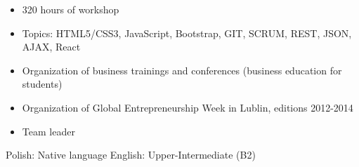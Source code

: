\documentclass{my_cv}
\begin{document}
\begin{adjustwidth}{2em}{0em}

\begin{itemize}
    \item 320 hours of workshop
    \item Topics: HTML5/CSS3, JavaScript, Bootstrap, GIT, SCRUM, REST, JSON, AJAX, React
\end{itemize}


\end{adjustwidth}
\vspace{1em}

\begin{multicols}{2}
    \begin{itemize}
        \item Organization of business trainings and conferences (business education for students)
        \item Organization of Global Entrepreneurship Week in Lublin, editions 2012-2014
        \item Team leader
    \end{itemize}
    \columnbreak
    \begin{adjustwidth}{1em}{0em}
    Polish: Native language
    \newline
    English: Upper-Intermediate (B2)
    \end{adjustwidth}
\end{multicols}
\end{document}
